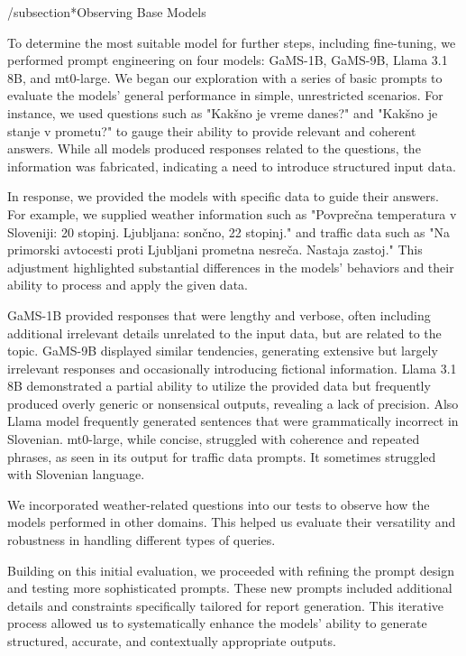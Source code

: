 /subsection*{Observing Base Models}

To determine the most suitable model for further steps, including fine-tuning, we performed prompt engineering on four models: GaMS-1B, GaMS-9B, Llama 3.1 8B, and mt0-large. We began our exploration with a series of basic prompts to evaluate the models' general performance in simple, unrestricted scenarios. For instance, we used questions such as "Kakšno je vreme danes?" and "Kakšno je stanje v prometu?" to gauge their ability to provide relevant and coherent answers. While all models produced responses related to the questions, the information was fabricated, indicating a need to introduce structured input data.

In response, we provided the models with specific data to guide their answers. For example, we supplied weather information such as "Povprečna temperatura v Sloveniji: 20 stopinj. Ljubljana: sončno, 22 stopinj." and traffic data such as "Na primorski avtocesti proti Ljubljani prometna nesreča. Nastaja zastoj." This adjustment highlighted substantial differences in the models' behaviors and their ability to process and apply the given data.

GaMS-1B provided responses that were lengthy and verbose, often including additional irrelevant details unrelated to the input data, but are related to the topic. GaMS-9B displayed similar tendencies, generating extensive but largely irrelevant responses and occasionally introducing fictional information. Llama 3.1 8B demonstrated a partial ability to utilize the provided data but frequently produced overly generic or nonsensical outputs, revealing a lack of precision. Also Llama model frequently generated sentences that were grammatically incorrect in Slovenian. mt0-large, while concise, struggled with coherence and repeated phrases, as seen in its output for traffic data prompts. It sometimes struggled with Slovenian language.

We incorporated weather-related questions into our tests to observe how the models performed in other domains. This helped us evaluate their versatility and robustness in handling different types of queries.

Building on this initial evaluation, we proceeded with refining the prompt design and testing more sophisticated prompts. These new prompts included additional details and constraints specifically tailored for report generation. This iterative process allowed us to systematically enhance the models' ability to generate structured, accurate, and contextually appropriate outputs.

